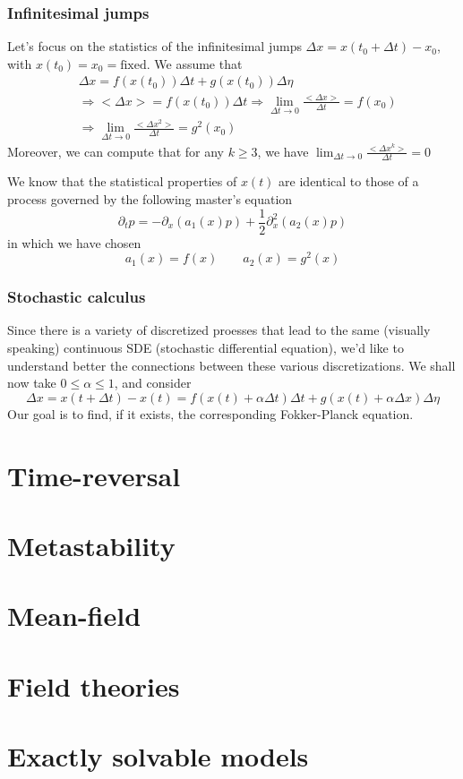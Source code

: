 \documentclass[a4paper]{book}
\theoremstyle{definition}
\theoremstyle{remark}
\begin{document}
\subsection{Infinitesimal jumps}
Let's focus on the statistics of the infinitesimal jumps $\Delta x = x(t_0 + \Delta t) - x_0$, with $x(t_0) = x_0 = \text{fixed}$. We assume that 
\begin{equation}
    \begin{aligned}
        &\Delta x = f(x(t_0))\Delta t + g(x(t_0))\Delta \eta \\
        &\Rightarrow <\Delta x> = f(x(t_0)) \Delta t \Rightarrow \lim_{\Delta t \rightarrow 0} \frac{<\Delta x>}{\Delta t} = f(x_0) \\ 
        &\Rightarrow \lim_{\Delta t \rightarrow 0} \frac{<\Delta x^2>}{\Delta t} = g^2(x_0)
    \end{aligned}
\end{equation}
Moreover, we can compute that for any $k\geq 3$, we have $ \lim_{\Delta t \rightarrow 0} \frac{<\Delta x^k>}{\Delta t} = 0$ \par \medskip

We know that the statistical properties of $x(t)$ are identical to those of a process governed by the following master's equation 
\begin{equation}
    \partial_t p = -\partial_x (a_1 (x)p ) + \frac{1}{2}\partial^2_x (a_2(x)p)
\end{equation}
in which we have chosen 
\begin{equation}
    a_1(x) = f(x) \qquad a_2(x) = g^2(x)
\end{equation}

\subsection{Stochastic calculus}

Since there is a variety of discretized proesses that lead to the same (visually speaking) continuous SDE (stochastic differential equation), we'd like to understand better the connections between these various discretizations. We shall now take $0 \leq \alpha \leq 1$, and consider 
\begin{equation}
    \Delta x = x(t + \Delta t) - x(t) = f(x(t) + \alpha\Delta t) \Delta t + g(x(t) + \alpha \Delta x)\Delta \eta  
\end{equation}
Our goal is to find, if it exists, the corresponding Fokker-Planck equation. 
\chapter{Time-reversal}

\chapter{Metastability}

\chapter{Mean-field}

\chapter{Field theories}

\chapter{Exactly solvable models}
\end{document}

